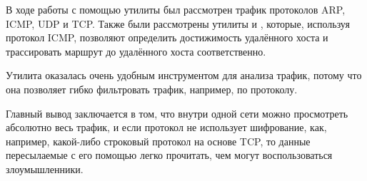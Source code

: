 В ходе работы с помощью утилиты  был рассмотрен трафик протоколов ARP, ICMP, UDP и TCP. Также были рассмотрены утилиты  и , которые, используя протокол ICMP, позволяют определить достижимость удалённого хоста и трассировать маршрут до удалённого хоста соответственно.

Утилита  оказалась очень удобным инструментом для анализа трафик, потому что она позволяет гибко фильтровать трафик, например, по протоколу.

Главный вывод заключается в том, что внутри одной сети можно просмотреть абсолютно весь трафик, и если протокол не использует шифрование, как, например, какой-либо строковый протокол на основе TCP, то данные пересылаемые с его помощью легко прочитать, чем могут воспользоваться злоумышленники.


